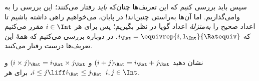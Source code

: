 \documentclass[../../../include/open-logic-section]{subfiles}
\begin{document}
سپس باید بررسی کنیم که این تعریف‌ها چنان‌که \emph{باید} رفتار
می‌کنند؛ این بررسی را به  وامی‌گذاریم. اما آن‌ها
به‌راستی چنین‌اند!{} در پایان، می‌خواهیم راهی داشته باشیم تا اعداد
صحیح را \emph{به‌منزلهٔ} اعداد گویا در نظر بگیریم؛ پس برای هر
$i \in \Int$ مقرر می‌کنیم که $i_\Rat =
\equivrep{i, 1_\Int}{\Ratequiv}$. در  دوباره بررسی
می‌کنیم که همهٔ این تعریف‌ها درست رفتار می‌کنند.

\begin{prob}
نشان دهید $(i + j)_\Rat = i_\Rat+ j_\Rat$ و $(i \times j)_\Rat =
i_\Rat \times j_\Rat$ و $i \leq j \liff i_\Rat \leq j_\Rat$، برای هر
$i, j \in \Int$.
\end{prob}
\end{document}
